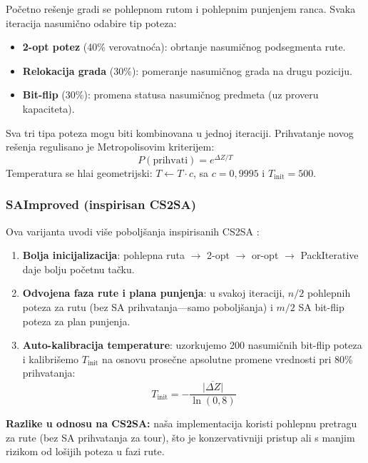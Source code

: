 \documentclass[12pt,a4paper]{article}
\begin{document}
Po\v{c}etno re\v{s}enje gradi se pohlepnom rutom i pohlepnim punjenjem ranca. Svaka iteracija nasumi\v{c}no odabire tip poteza:
\begin{itemize}
    \item \textbf{2-opt potez} (40\% verovatno\'{c}a): obrtanje nasumi\v{c}nog podsegmenta rute.
    \item \textbf{Relokacija grada} (30\%): pomeranje nasumi\v{c}nog grada na drugu poziciju.
    \item \textbf{Bit-flip} (30\%): promena statusa nasumi\v{c}nog predmeta (uz proveru kapaciteta).
\end{itemize}
Sva tri tipa poteza mogu biti kombinovana u jednoj iteraciji. Prihvatanje novog re\v{s}enja regulisano je Metropolisovim kriterijem:
\begin{equation}
    P(\text{prihvati}) = e^{\Delta Z / T}
\end{equation}
Temperatura se hla\dj{}i geometrijski: $T \leftarrow T \cdot c$, sa $c = 0{,}9995$ i $T_{\text{init}} = 500$.

\subsubsection{SAImproved (inspirisan CS2SA)}

Ova varijanta uvodi vi\v{s}e pobolj\v{s}anja inspirisanih CS2SA \cite{yafrani2016}:

\begin{enumerate}
    \item \textbf{Bolja inicijalizacija}: pohlepna ruta $\to$ 2-opt $\to$ or-opt $\to$ PackIterative daje bolju po\v{c}etnu ta\v{c}ku.
    \item \textbf{Odvojena faza rute i plana punjenja}: u svakoj iteraciji, $n/2$ pohlepnih poteza za rutu (bez SA prihvatanja---samo pobolj\v{s}anja) i $m/2$ SA bit-flip poteza za plan punjenja.
    \item \textbf{Auto-kalibracija temperature}: uzorkujemo 200 nasumi\v{c}nih bit-flip poteza i kalibrišemo $T_{\text{init}}$ na osnovu prose\v{c}ne apsolutne promene vrednosti pri 80\% prihvatanja:
    \begin{equation}
        T_{\text{init}} = -\frac{\overline{|\Delta Z|}}{\ln(0{,}8)}
    \end{equation}
\end{enumerate}

\textbf{Razlike u odnosu na CS2SA:} na\v{s}a implementacija koristi pohlepnu pretragu za rute (bez SA prihvatanja za tour), \v{s}to je konzervativniji pristup ali s manjim rizikom od lo\v{s}ijih poteza u fazi rute.
\end{document}
